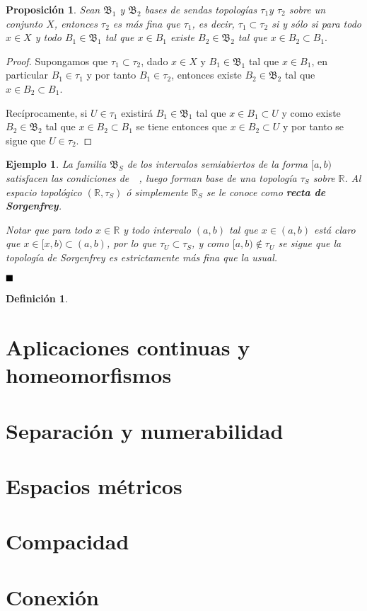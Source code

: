 \documentclass[12pt]{article}
\newtheorem{proposition}[theorem]{Proposición}
\newtheorem{definition}[theorem]{Definición}
\newtheorem{example}{Ejemplo}[theorem]
\begin{document}
\begin{proposition}Sean $\mathfrak{B}_1$ y $\mathfrak{B}_2$ bases de sendas topologías $\tau_1 $y $\tau_2$ sobre un conjunto $X$, entonces $\tau_2$ es más fina que $\tau_1$, es decir, $\tau_1 \subset \tau_2$ si y sólo si para todo $x\in X$ y todo $B_1 \in \mathfrak{B}_1$ tal que $x\in B_1$ existe $B_2 \in \mathfrak{B}_2$ tal que $x \in B_2 \subset B_1.$
\end{proposition}
\begin{proof}Supongamos que $\tau_1 \subset \tau_2$, dado $x \in X$ y $B_1\in \mathfrak{B}_1$ tal que $x \in B_1$, en particular $B_1 \in \tau_1$ y por tanto $B_1 \in \tau_2$, entonces existe $B_2 \in \mathfrak{B}_2$ tal que $x \in B_2 \subset B_1$.

Recíprocamente, si $U \in \tau_1$ existirá $B_1 \in \mathfrak{B}_1$ tal que $x \in B_1 \subset U$ y como existe $B_2 \in \mathfrak{B}_2$ tal que $x \in B_2 \subset B_1$ se tiene entonces que $x \in B_2 \subset U$ y por tanto se sigue que $U \in \tau_2$.

\end{proof}

\begin{example}
La familia $\mathfrak{B}_S$ de los intervalos semiabiertos de la forma $[a,b)$ satisfacen las condiciones de~~, luego forman base de una topología $\tau_S$ sobre $\mathbb{R}$. Al espacio topológico $(\mathbb{R},\tau_S)$ ó simplemente $\mathbb{R}_S$ se le conoce como \textbf{recta de Sorgenfrey}.

Notar que para todo $x \in \mathbb{R}$ y todo intervalo $(a,b)$ tal que $x \in (a,b)$ está claro que $x \in [x,b) \subset (a,b)$, por lo que $\tau_U \subset \tau_S$, y como $[a,b) \notin \tau_U$ se sigue que la topología de Sorgenfrey es estrictamente más fina que la usual.
\end{example}

$\hfill \blacksquare$

\begin{definition}
\end{definition}

\section{Aplicaciones continuas y homeomorfismos}
\section{Separación y numerabilidad}
\section{Espacios métricos}
\section{Compacidad}
\section{Conexión}
\end{document}
